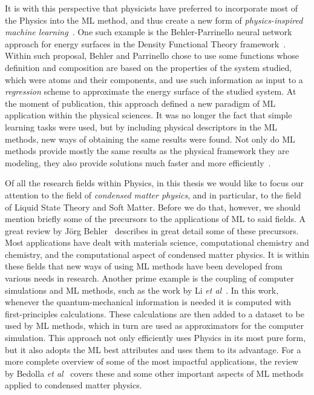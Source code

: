It is with this perspective that physicists have preferred to incorporate most of the 
Physics into the ML method, and thus create a new form of
\emph{physics-inspired machine learning}~\cite{karniadakisPhysicsinformedMachineLearning2021a}.
One such example is the Behler-Parrinello neural network approach for energy surfaces
in the Density Functional Theory framework~\cite{behlerGeneralizedNeuralNetworkRepresentation2007a}.
Within such proposal, Behler and Parrinello chose to use some functions whose 
definition and composition are based on the properties of the system studied, which were 
atoms and their components,
and use such information as input to a \emph{regression} scheme to approximate the
energy surface of the studied system. At the moment of publication, this approach
defined a new paradigm of ML application within the physical sciences. It was no longer
the fact that simple learning tasks were used, but by including physical descriptors
in the ML methods, new ways of obtaining the same results were found.
Not only do ML methods provide mostly the same results as the physical framework they
are modeling, they also provide solutions much faster and more efficiently~\cite{zhuPhysicsconstrainedDeepLearning2019}.

Of all the research fields within Physics, in this thesis we would like to focus
our attention to the field of \emph{condensed matter physics}, and in particular, to the
field of Liquid State Theory and Soft Matter. Before we do that, however, we should
mention briefly some of the precursors to the applications of ML to said fields.
A great review by J\"{o}rg Behler~\cite{behlerPerspectiveMachineLearning2016a}
describes in great detail some of these precursors. Most applications have dealt with
materials science, computational chemistry and chemistry, and the computational aspect
of condensed matter physics. It is within these fields that new ways of using ML methods
have been developed from various needs in research. Another prime example is the coupling
of computer simulations and ML methods, such as the work by Li \emph{et al}~\cite{liMolecularDynamicsOntheFly2015}.
In this work, whenever the quantum-mechanical information is needed it is computed with
first-principles calculations. These calculations are then added to a dataset to be used
by ML methods, which in turn are used as approximators for the computer simulation.
This approach not only efficiently uses Physics in its most pure form, but it also
adopts the ML best attributes and uses them to its advantage.
For a more complete overview of some of the most impactful applications, the
review by Bedolla \emph{et al}~\cite{bedollaMachineLearningCondensed2020}
covers these and some other important aspects of ML methods applied to
condensed matter physics.

